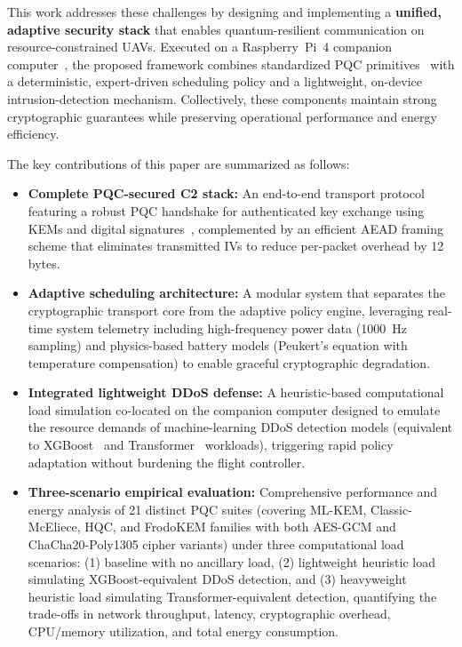 \documentclass[sigconf,natbib=false]{acmart}
\begin{document}
This work addresses these challenges by designing and implementing a \textbf{unified, adaptive security stack} that enables quantum-resilient communication on resource-constrained UAVs. Executed on a Raspberry~Pi~4 companion computer~\cite{raspi4_specs}, the proposed framework combines standardized PQC primitives~\cite{nist_fips_203_2024,nist_fips_204_2024,nist_fips_205_2024} with a deterministic, expert-driven scheduling policy and a lightweight, on-device intrusion-detection mechanism. Collectively, these components maintain strong cryptographic guarantees while preserving operational performance and energy efficiency.

The key contributions of this paper are summarized as follows:
\begin{itemize}
    \item \textbf{Complete PQC-secured C2 stack:} An end-to-end transport protocol featuring a robust PQC handshake for authenticated key exchange using KEMs and digital signatures~\cite{nist_fips_203_2024,nist_fips_204_2024,nist_fips_205_2024,fips206_status_2025}, complemented by an efficient AEAD framing scheme that eliminates transmitted IVs to reduce per-packet overhead by 12 bytes.
    \item \textbf{Adaptive scheduling architecture:} A modular system that separates the cryptographic transport core from the adaptive policy engine, leveraging real-time system telemetry including high-frequency power data (1000~Hz sampling) and physics-based battery models (Peukert's equation with temperature compensation) to enable graceful cryptographic degradation.
    \item \textbf{Integrated lightweight DDoS defense:} A heuristic-based computational load simulation co-located on the companion computer designed to emulate the resource demands of machine-learning DDoS detection models (equivalent to XGBoost~\cite{xgboost_2016} and Transformer~\cite{futureinternet_transformer_iiot_2025} workloads), triggering rapid policy adaptation without burdening the flight controller.
    \item \textbf{Three-scenario empirical evaluation:} Comprehensive performance and energy analysis of 21 distinct PQC suites (covering ML-KEM, Classic-McEliece, HQC, and FrodoKEM families with both AES-GCM and ChaCha20-Poly1305 cipher variants) under three computational load scenarios: (1) baseline with no ancillary load, (2) lightweight heuristic load simulating XGBoost-equivalent DDoS detection, and (3) heavyweight heuristic load simulating Transformer-equivalent detection, quantifying the trade-offs in network throughput, latency, cryptographic overhead, CPU/memory utilization, and total energy consumption.
\end{itemize}
\end{document}
